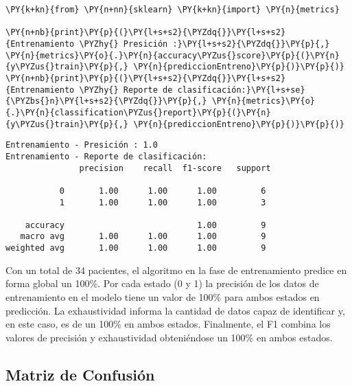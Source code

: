     \begin{tcolorbox}[breakable, size=fbox, boxrule=1pt, pad at break*=1mm,colback=cellbackground, colframe=cellborder]
\begin{Verbatim}[commandchars=\\\{\}]
\PY{k+kn}{from} \PY{n+nn}{sklearn} \PY{k+kn}{import} \PY{n}{metrics}

\PY{n+nb}{print}\PY{p}{(}\PY{l+s+s2}{\PYZdq{}}\PY{l+s+s2}{Entrenamiento \PYZhy{} Presición :}\PY{l+s+s2}{\PYZdq{}}\PY{p}{,} \PY{n}{metrics}\PY{o}{.}\PY{n}{accuracy\PYZus{}score}\PY{p}{(}\PY{n}{y\PYZus{}train}\PY{p}{,} \PY{n}{prediccionEntreno}\PY{p}{)}\PY{p}{)}
\PY{n+nb}{print}\PY{p}{(}\PY{l+s+s2}{\PYZdq{}}\PY{l+s+s2}{Entrenamiento \PYZhy{} Reporte de clasificación:}\PY{l+s+se}{\PYZbs{}n}\PY{l+s+s2}{\PYZdq{}}\PY{p}{,} \PY{n}{metrics}\PY{o}{.}\PY{n}{classification\PYZus{}report}\PY{p}{(}\PY{n}{y\PYZus{}train}\PY{p}{,} \PY{n}{prediccionEntreno}\PY{p}{)}\PY{p}{)}
\end{Verbatim}
\end{tcolorbox}

    \begin{Verbatim}[commandchars=\\\{\}]
Entrenamiento - Presición : 1.0
Entrenamiento - Reporte de clasificación:
               precision    recall  f1-score   support

           0       1.00      1.00      1.00         6
           1       1.00      1.00      1.00         3

    accuracy                           1.00         9
   macro avg       1.00      1.00      1.00         9
weighted avg       1.00      1.00      1.00         9

    \end{Verbatim}

    Con un total de 34 pacientes, el algoritmo en la fase de entrenamiento predice en forma global un 100\%. Por cada estado (0 y 1) la precisión de los datos de entrenamiento en el modelo tiene un valor de 100\% para ambos estados en predicción. La exhaustividad informa la cantidad de datos capaz de identificar y, en este caso, es de un 100\% en ambos estados. Finalmente, el F1 combina los valores de precisión y exhaustividad obteniéndose un 100\% en ambos estados.
    
    \hypertarget{matriz-de-confusiuxf3n}{%
\subsection{Matriz de Confusión}\label{matriz-de-confusiuxf3n}}

